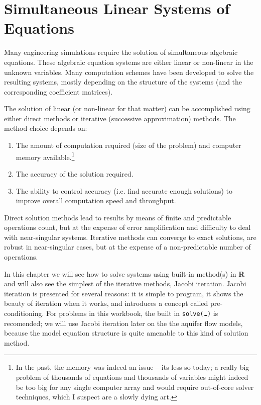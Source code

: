 \section{Simultaneous Linear Systems of Equations}
Many engineering simulations require the solution of simultaneous algebraic equations.
These algebraic equation systems are either linear or non-linear in the unknown variables.
Many computation schemes have been developed to solve the resulting systems, mostly depending on the structure of the systems (and the corresponding coefficient matrices).

The solution of linear (or non-linear for that matter) can be accomplished using either direct methods or iterative (successive approximation) methods. 
The method choice depends on:
\begin{enumerate}
\item The amount of computation required (size of the problem) and computer memory available.\footnote{In the past, the memory was indeed an issue -- its less so today; a really big problem of thousands of equations and thousands of variables might indeed be too big for any single computer array and would require out-of-core solver techniques, which I suspect are a slowly dying art.}
\item The accuracy of the solution required.
\item The ability to control accuracy (i.e. find accurate enough solutions) to improve overall computation speed and throughput.
\end{enumerate}
Direct solution methods lead to results by means of finite and predictable operations count, but at the expense of error amplification and  difficulty to deal with near-singular systems.  
Iterative methods can converge to exact solutions, are robust in near-singular cases, but at the expense of a non-predictable number of operations.   

In this chapter we will see how to solve systems using built-in method(s) in \textbf{R} and will also see the simplest of the iterative methods, Jacobi iteration.  
Jacobi iteration is presented for several reasons: it is simple to program, it shows the beauty of iteration when it works, and introduces a concept called pre-conditioning.
For problems in this workbook, the built in \texttt{solve(\dots)} is recomended; we will use Jacobi iteration later on the the aquifer flow models, because the model equation structure is quite amenable to this kind of solution method.  

